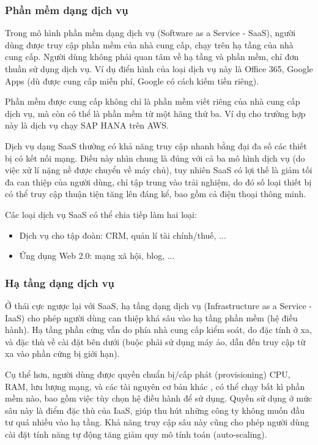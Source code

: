 \documentclass{article}
\begin{document}
\subsubsection{Phần mềm dạng dịch vụ}

Trong mô hình phần mềm dạng dịch vụ (Software as a Service - SaaS), người dùng
được truy cập phần mềm của nhà cung cấp, chạy trên hạ tầng của nhà cung cấp.
Người dùng không phải quan tâm về hạ tầng và phần mềm, chỉ đơn thuần sử dụng
dịch vụ. Ví dụ điển hình của loại dịch vụ này là Office 365, Google Apps (dù
được cung cấp miễn phí, Google có cách kiếm tiền riêng).

Phần mềm được cung cấp không chỉ là phần mềm viết riêng của nhà cung cấp dịch
vụ, mà còn có thể là phần mềm từ một hãng thứ ba. Ví dụ cho trường hợp này là
dịch vụ chạy SAP HANA trên AWS.

Dịch vụ dạng SaaS thường có khả năng truy cập nhanh bằng đại đa số các thiết bị
có kết nối mạng. Điều này nhìn chung là đúng với cả ba mô hình dịch vụ (do việc
xử lí nặng nề được chuyển về máy chủ), tuy nhiên SaaS có lợi thế là giảm tối đa
can thiệp của người dùng, chỉ tập trung vào trải nghiệm, do đó số loại thiết bị
có thể truy cập thuận tiện tăng lên đáng kể, bao gồm cả điện thoại thông minh.

Các loại dịch vụ SaaS có thể chia tiếp làm hai loại:

\begin{itemize}
    \item Dịch vụ cho tập đoàn: CRM, quản lí tài chính/thuế, ...
    \item Ứng dụng Web 2.0: mạng xã hội, blog, ...
\end{itemize}

\subsubsection{Hạ tầng dạng dịch vụ}

Ở thái cực ngược lại với SaaS, hạ tầng dạng dịch vụ (Infrastructure as a Service
- IaaS) cho phép người dùng can thiệp khá sâu vào hạ tầng phần mềm (hệ điều
hành). Hạ tầng phần cứng vẫn do phía nhà cung cấp kiểm soát, do đặc tính ở xa,
và đặc thù về cài đặt bên dưới (buộc phải sử dụng máy ảo, dẫn đến truy cập từ xa
vào phần cứng bị giới hạn).

Cụ thể hơn, người dùng được quyền chuẩn bị/cấp phát (provisioning) CPU, RAM, lưu
lượng mạng, và các tài nguyên cơ bản khác \cite{MARINESCU201813}, có thể chạy
bất kì phần mềm nào, bao gồm việc tùy chọn hệ điều hành để sử dụng. Quyền sử
dụng ở mức sâu này là điểm đặc thù của IaaS, giúp thu hút những công ty không
muốn đầu tư quá nhiều vào hạ tầng. Khả năng truy cập sâu này cũng cho phép người
dùng cài đặt tính năng tự động tăng giảm quy mô tính toán (auto-scaling).
\end{document}
